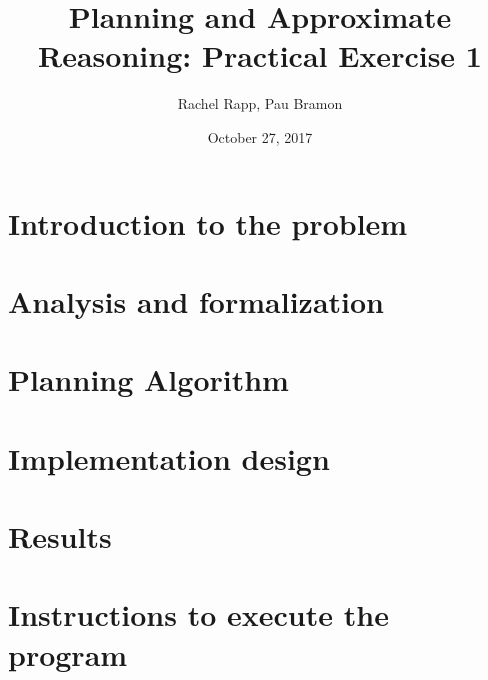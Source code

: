 \documentclass[11pt]{scrartcl}
\begin{document}
%
\title{Planning and Approximate Reasoning: Practical Exercise 1}
\date{October 27, 2017}
\author{Rachel Rapp, Pau Bramon}
\maketitle

\section{Introduction to the problem}



\section{Analysis and formalization}



\section{Planning Algorithm}


\section{Implementation design}


\section{Results}


\section{Instructions to execute the program}
\end{document}
